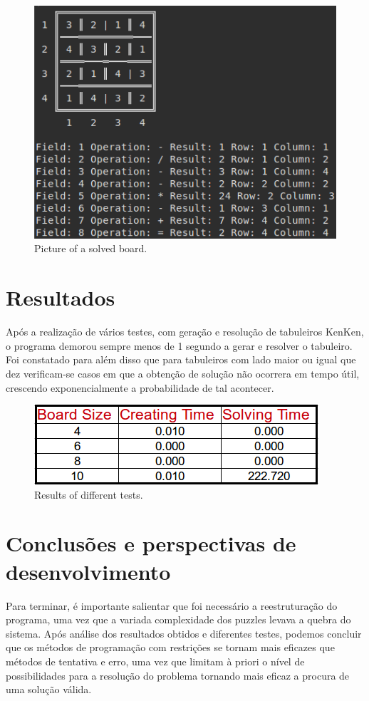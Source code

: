 \documentclass[runningheads,a4paper]{llncs}
\begin{document}
\begin{figure}
\centering
\includegraphics[scale=0.5]{solve}
\caption{Picture of a solved board.}
\label{fig:example}
\end{figure}

\FloatBarrier

\section{Resultados}
Após a realização de vários testes, com geração e resolução de tabuleiros KenKen, o programa demorou sempre menos de 1 segundo a gerar e resolver o tabuleiro. Foi constatado para além disso que para tabuleiros com lado maior ou igual que dez verificam-se casos em que a obtenção de solução não ocorrera em tempo útil, crescendo exponencialmente a
probabilidade de tal acontecer.

\begin{figure}
\centering
\includegraphics[scale=0.8]{table}
\caption{Results of different tests.}
\label{fig:example}
\end{figure}

\FloatBarrier

\section{Conclusões e perspectivas de desenvolvimento}
Para terminar, é importante salientar que foi necessário a reestruturação do programa, uma vez que a variada complexidade dos puzzles levava a quebra do sistema.
Após análise dos resultados obtidos e diferentes testes, podemos concluir que os métodos de programação com restrições se tornam mais eficazes que métodos de tentativa e erro, uma vez que limitam à priori o nível de possibilidades para a resolução do problema tornando mais eficaz a procura de uma solução válida.
\end{document}
